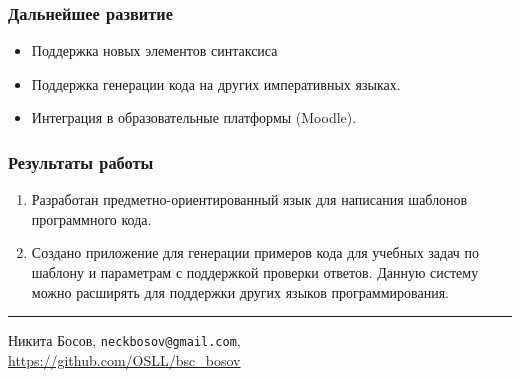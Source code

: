 \documentclass[14pt,aspectratio=169,hyperref={pdftex,unicode},xcolor=dvipsnames]{beamer}
\begin{document}

\begin{frame}
    \frametitle{Дальнейшее развитие}
    \begin{itemize}
        \item Поддержка новых элементов синтаксиса
        \item Поддержка генерации кода на других императивных языках.
        \item Интеграция в образовательные платформы (Moodle).
    \end{itemize}
\end{frame}






\begin{frame}
    \frametitle{Результаты работы}

    \begin{enumerate}
        \item Разработан предметно-ориентированный язык для написания шаблонов программного кода.
        \item Создано приложение для генерации примеров кода для учебных задач по шаблону и параметрам
        с поддержкой проверки ответов. Данную систему можно расширять для поддержки других языков программирования.
    \end{enumerate}
        \vspace{5mm}\hrule\vspace{5mm}

    \begin{center}
        Никита Босов, \texttt{neckbosov@gmail.com},\\ \url{https://github.com/OSLL/bsc_bosov}
    \end{center}
\end{frame}
\end{document}
